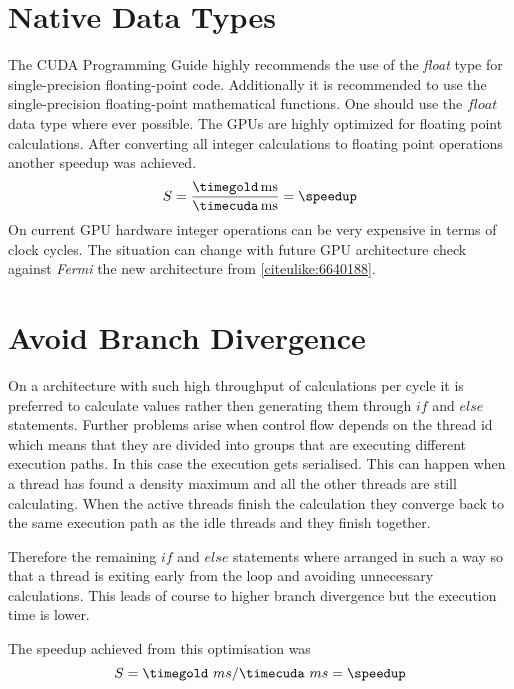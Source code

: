 \section{Native Data Types}
The \gls{CUDA} Programming Guide \citep{citeulike:3325943} highly recommends the
use of the \emph{float} type for single-precision floating-point code.
Additionally it is recommended to use the single-precision floating-point
mathematical functions. One should use the $float$ data type where ever
possible. The \glspl{GPU} are highly optimized for floating point calculations.
After converting all integer calculations to floating point operations another
speedup was achieved.
\fpDiv{\speedup}{\timegold}{\timecuda}
\begin{equation*}\label{eq:speedup5}
	S = \frac{\unit[\timegold]{ms}}{\unit[\timecuda]{ms}} = \speedup
\end{equation*}
On current \gls{GPU} hardware integer operations can be very expensive in terms
of clock cycles. The situation can change with future \gls{GPU} architecture check
against \emph{Fermi} the new architecture from {} 
\autoref{citeulike:6640188}.



\section{Avoid Branch Divergence} %
\label{sec:avoid_branch_divergence}
On a architecture with such high throughput of calculations per cycle it is
preferred to calculate values rather then generating them through $if$ and
$else$ statements. Further problems arise when control flow depends on the
thread id which means that they are divided into groups that are executing
different execution paths. In this case the execution gets serialised. This can
happen when a thread has found a density maximum and all the other threads are
still calculating. When the active threads finish the calculation they converge
back to the same execution path as the idle threads and they finish together.

Therefore the remaining $if$ and $else$ statements where arranged in such a way
so that a thread is exiting early from the loop and avoiding unnecessary
calculations. This leads of course to higher branch divergence but the execution
time is lower. 

The speedup achieved from this optimisation was
\fpDiv{\speedup}{\timegold}{\timecuda}
\begin{equation*}\label{eq:speedup6}
	S = \timegold\ ms/\timecuda\ ms = \speedup
\end{equation*}




